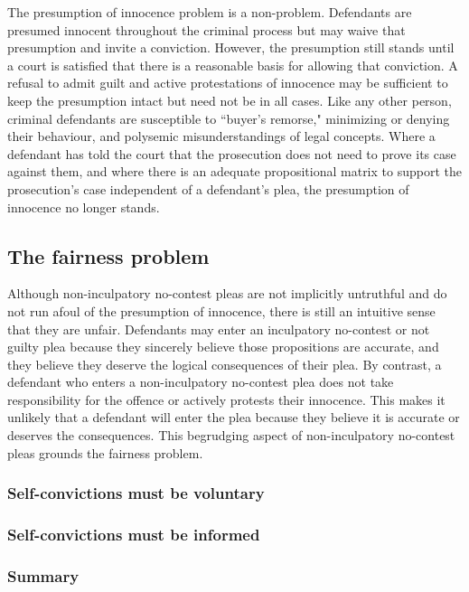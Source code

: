 The presumption of innocence problem is a non-problem. Defendants are presumed innocent throughout the criminal process but may waive that presumption and invite a conviction. However, the presumption still stands until a court is satisfied that there is a reasonable basis for allowing that conviction. A refusal to admit guilt and active protestations of innocence may be sufficient to keep the presumption intact but need not be in all cases. Like any other person, criminal defendants are susceptible to ``buyer's remorse," minimizing or denying their behaviour, and polysemic misunderstandings of legal concepts. Where a defendant has told the court that the prosecution does not need to prove its case against them, and where there is an adequate propositional matrix to support the prosecution's case independent of a defendant's plea, the presumption of innocence no longer stands.

\subsection{The fairness problem}

Although non-inculpatory no-contest pleas are not implicitly untruthful and do not run afoul of the presumption of innocence, there is still an intuitive sense that they are unfair. Defendants may enter an inculpatory no-contest or not guilty plea because they sincerely believe those propositions are accurate, and they believe they deserve the logical consequences of their plea. By contrast, a defendant who enters a non-inculpatory no-contest plea does not take responsibility for the offence or actively protests their innocence. This makes it unlikely that a defendant will enter the plea because they believe it is accurate or deserves the consequences. This begrudging aspect of non-inculpatory no-contest pleas grounds the fairness problem. 

\subsubsection{Self-convictions must be voluntary}



\subsubsection{Self-convictions must be informed}



\subsubsection{Summary}

